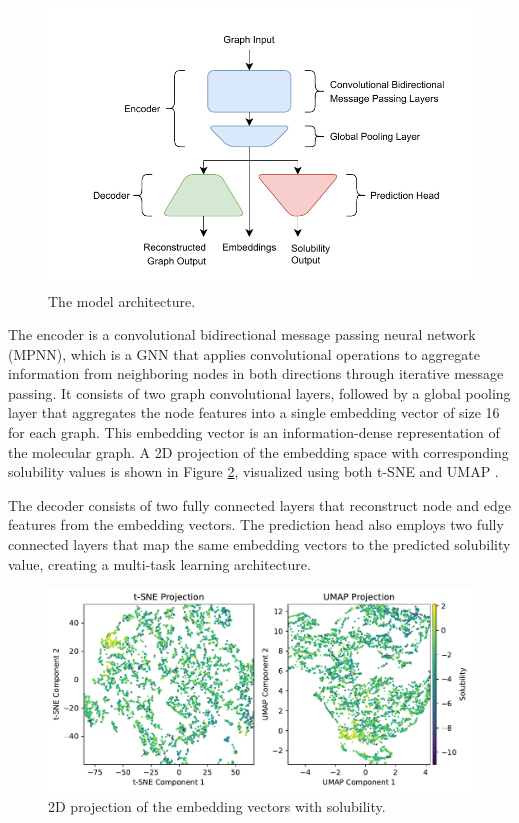 \documentclass[11pt,a4paper]{article}
\begin{document}
\begin{figure}[htbp]
        \centering
        \includegraphics[width=1\textwidth]{model.pdf}
        \caption{The model architecture.}
        \label{fig:model}
\end{figure}

The encoder is a convolutional bidirectional message passing neural network (MPNN), which is a GNN that applies convolutional operations to aggregate information from neighboring nodes in both directions through iterative message passing. It consists of two graph convolutional layers, followed by a global pooling layer that aggregates the node features into a single embedding vector of size 16 for each graph. This embedding vector is an information-dense representation of the molecular graph. A 2D projection of the embedding space with corresponding solubility values is shown in Figure \ref{fig:solubility}, visualized using both t-SNE \cite{van2008visualizing} and UMAP \cite{mcinnes2018umap}.

The decoder consists of two fully connected layers that reconstruct node and edge features from the embedding vectors. The prediction head also employs two fully connected layers that map the same embedding vectors to the predicted solubility value, creating a multi-task learning architecture.

\begin{figure}[htbp]
        \centering
        \includegraphics[width=1\textwidth]{solubility.pdf}
        \caption{2D projection of the embedding vectors with solubility.}
        \label{fig:solubility}
\end{figure}
\end{document}
